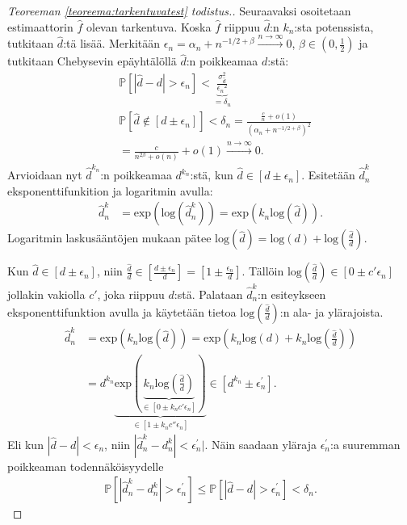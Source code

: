 \documentclass[finnish,12pt,a4paper,pdftex,sci,utf8]{aaltothesis}
\begin{document}
\begin{proof}[Teoreeman \ref{teoreema:tarkentuvatest} todistus.]
	Seuraavaksi osoitetaan estimaattorin $\hat{f}$ olevan tarkentuva. Koska $\hat{f}$ riippuu $\hat{d}$:n $k_n$:sta potenssista, tutkitaan $\hat{d}$:tä lisää. Merkitään $\epsilon_{n}^{} = \alpha_n + n^{-1/2 + \beta} \xrightarrow{n \rightarrow \infty} 0 $, $\beta \in (0,\frac{1}{2})$ ja tutkitaan Chebysevin epäyhtälöllä $\hat{d}$:n poikkeamaa $d$:stä:
	\begin{align*}
		&\mathbb{P}[|\hat{d} - d| > \epsilon_{n}^{}] < \underbrace{\frac{\sigma_{\hat{d}}^2}{{\epsilon_{n}^{}}^2}}_{ = \delta_n} \\
		&\mathbb{P}[\hat{d} \notin [d \pm  \epsilon_{n}^{}]] < \delta_n = \frac{\frac{c}{n} + o(1)}{(\alpha_n + n^{-1/2 + \beta})^2} \\
		&= \frac{c}{{n^{2 \beta}} +  o(n)} + o(1) \xrightarrow{n \rightarrow \infty} 0.
	\end{align*}
	Arvioidaan nyt $\hat{d}^{k_n}$:n poikkeamaa $d^{k_n}$:stä, kun $\hat{d} \in [d \pm \epsilon_{n}^{}]$.
	Esitetään $\hat{d}^k_n$ eksponenttifunkition ja logaritmin avulla:
	\begin{align*}
		\hat{d}^k_n &= \text{exp}(\text{log}(\hat{d}^k_n)) = \text{exp}(k_n \text{log}(\hat{d})).
	\end{align*}
	Logaritmin laskusääntöjen mukaan pätee $\text{log}(\hat{d}) = \text{log}(d) + \text{log}(\frac{\hat{d}}{d})$.

	Kun $\hat{d} \in [d \pm \epsilon_{n}^{}]$, niin $\frac{\hat{d}}{d} \in [\frac{d \pm \epsilon_{n}^{}}{d}] = [1 \pm \frac{\epsilon_{n}^{}}{d}]$. Tällöin $\text{log}(\frac{\hat{d}}{d}) \in [0 \pm c'\epsilon_{n}^{}]$ jollakin vakiolla $c'$, joka riippuu $d$:stä.
	Palataan $\hat{d}^k_n$:n esiteykseen eksponenttifunktion avulla ja käytetään tietoa $\text{log}(\frac{\hat{d}}{d})$:n ala- ja ylärajoista.
	\begin{align*}
		\hat{d}^k_n &= \text{exp}(k_n \text{log}(\hat{d})) = \text{exp}(k_n\text{log}(d) + k_n \text{log}(\frac{\hat{d}}{d})) \\
		&= d^{k_n} \underbrace{\text{exp}(\underbrace{k_n \text{log}(\frac{\hat{d}}{d})}_{\in [0 \pm k_n c' \epsilon_{n}^{}]})}_{\in [1 \pm k_n c'' \epsilon_{n}^{}]} \in [d^{k_n} \pm \epsilon_{n}^{'}].
	\end{align*}
	Eli  kun $|\hat{d} - d| < \epsilon_{n}^{}$, niin $|\hat{d}^k_n - d^k_n| < \epsilon_{n}^{'}|$. Näin saadaan yläraja $\epsilon_{n}^{'}$:a suuremman poikkeaman todennäköisyydelle 
	\begin{align*}
		\mathbb{P}[|\hat{d}^k_n - d^k_n| > \epsilon_{n}^{'}] \leq \mathbb{P}[|\hat{d} - d| > \epsilon_{n}^{'}] < \delta_n.
	\end{align*}


\end{proof}
\end{document}
